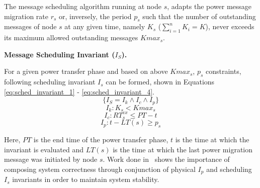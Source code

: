 The message scheduling algorithm running at node $s$, adapts the power 
message migration rate $r_s$ or, inversely, the period $p_s$ such that the number of outstanding messages
of node $s$ at any given time, namely $K_s$ ($\sum_{i=1}^n K_i = K$), never exceeds its maximum allowed 
outstanding messages $Kmax_s$.


{\bf Message Scheduling Invariant ($I_S$).}

For a given power transfer phase and based on above $Kmax_s$, $p_s$ constraints, following scheduling invariant
$I_s$ can be formed, shown in
Equations \ref{eq:sched_invariant_1} - \ref{eq:sched_invariant_4}.
\begin{equation}
\{I_S = I_k \wedge I_c \wedge I_p\}
\label{eq:sched_invariant_1} 
\end{equation}
\begin{equation}
I_k: K_s < Kmax_s 
\label{eq:sched_invariant_2}
\end{equation}
\begin{equation}
I_c: RT_s^{ex} \leq PT - t 
\label{eq:sched_invariant_3}
\end{equation}
\begin{equation}
I_p: t - LT(s) \geq p_s
\label{eq:sched_invariant_4}
\end{equation}

Here, $PT$ is the end time of the power transfer phase, $t$ is the time at which
the invariant is evaluated and $LT(s)$ is the time at which the last power
migration message was initiated by node $s$. Work done in~\cite{acsmartgrid} shows the importance of
composing system correctness through conjunction of physical $I_p$ and scheduling $I_s$ invariants in order
to maintain system stability.





